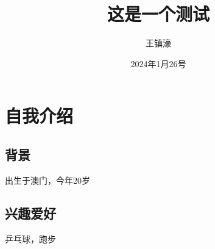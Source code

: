 \documentclass[UTF8]{ctexart}
\title{这是一个测试}
\author{王镇濠}
\date{2024年1月26号}
\begin{document}
    \maketitle
    \tableofcontents
    
    \section{自我介绍}
    \subsection{背景}
        出生于澳门，今年20岁
    \subsection{兴趣爱好}
        乒乓球，跑步
\end{document}
